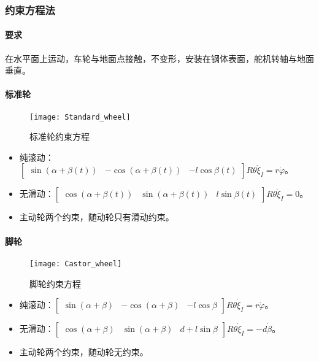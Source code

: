 \documentclass[
12pt, %
a4paper, 
oneside, %
headinclude,footinclude, %
]{scrartcl}
\begin{document}
\subsubsection{约束方程法}
\paragraph{要求}
在水平面上运动，车轮与地面点接触，不变形，安装在钢体表面，舵机转轴与地面垂直。
\paragraph{标准轮}
\begin{figure}[H]
\centering 
\texttt{[image: Standard\_wheel]} 
\caption[标准轮约束方程]{标准轮约束方程}
\end{figure}

\begin{itemize}
\item 纯滚动：$ \begin{bmatrix} \sin(\alpha + \beta(t)) & -\cos(\alpha + \beta(t)) & -l\cos\beta(t) \end{bmatrix} R\theta \dot{\xi}_I = r\dot{\varphi} $。
\item 无滑动：$ \begin{bmatrix} \cos(\alpha + \beta(t)) & \sin(\alpha + \beta(t)) & l\sin\beta(t) \end{bmatrix} R\theta \dot{\xi}_I = 0 $。
\item 主动轮两个约束，随动轮只有滑动约束。
\end{itemize}
\paragraph{脚轮}
\begin{figure}[H]
\centering 
\texttt{[image: Castor\_wheel]} 
\caption[脚轮约束方程]{脚轮约束方程}
\end{figure}

\begin{itemize}
\item 纯滚动：$ \begin{bmatrix} \sin(\alpha + \beta) & -\cos(\alpha + \beta) & -l\cos\beta \end{bmatrix} R\theta \dot{\xi}_I = r\dot{\varphi} $。
\item 无滑动：$ \begin{bmatrix} \cos(\alpha + \beta) & \sin(\alpha + \beta) & d + l\sin\beta \end{bmatrix} R\theta \dot{\xi}_I = -d\dot{\beta} $。
\item 主动轮两个约束，随动轮无约束。
\end{itemize}
\end{document}
